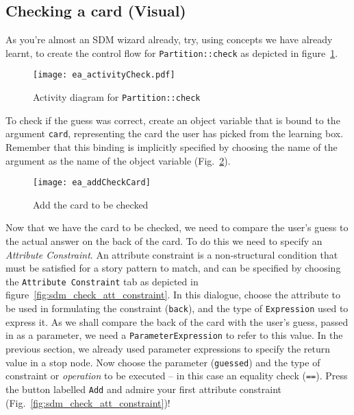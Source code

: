 \newpage
\subsection{Checking a card (Visual)}
\visHeader
\hypertarget{checkCard vis}{}

As you're almost an SDM wizard already, try, using concepts we have already learnt, to create the control flow for \texttt{Partition::check} as depicted in
figure~\ref{fig:sdm_check_start}.

\begin{figure}[htbp]
\begin{center}
  \texttt{[image: ea\_activityCheck.pdf]}
  \caption{Activity diagram for \texttt{Partition::check}}
  \label{fig:sdm_check_start}
\end{center}
\end{figure}

To check if the guess was correct, create an object variable that is bound to the argument \texttt{card}, representing the card the user has picked from the
learning box. Remember that this binding is implicitly specified by choosing the name of the argument as the name of the object variable 
(Fig.~\ref{fig:sdm_check_addCard}).

\begin{figure}[htbp]
\begin{center}
  \texttt{[image: ea\_addCheckCard]}
  \caption{Add the card to be checked}
  \label{fig:sdm_check_addCard}
\end{center}
\end{figure}

Now that we have the card to be checked, we need to compare the user's guess to the actual answer on the back of the card. To do this
we need to specify an \emph{Attribute Constraint}. An attribute constraint is a non-structural condition that must be satisfied for a story pattern to match,
and can be specified by choosing the \texttt{Attribute Constraint} tab as depicted in figure~\ref{fig:sdm_check_att_constraint}. In this dialogue, choose the
attribute to be used in formulating the constraint (\texttt{back}), and the type of \texttt{Expression} used to express it. As we shall compare the
back of the card with the user's guess, passed in as a parameter, we need a \texttt{ParameterExpression} to refer to this value.
In the previous section, we already used parameter expressions to specify the return value in a stop node. Now choose the parameter (\texttt{guessed}) and the
type of constraint or \emph{operation} to be executed -- in this case an equality check (\texttt{==}). Press the button labelled \texttt{Add} and admire your
first attribute constraint (Fig.~\ref{fig:sdm_check_att_constraint})!

